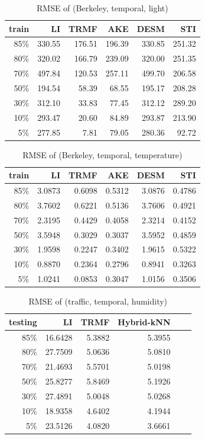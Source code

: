 \begin{table}[htbp]
\centering
\caption{RMSE of (Berkeley, temporal, light)}
\label{table:berkeley_temporal_light}
\begin{tabular}{ r | r r r r r}
	train	&LI	&TRMF	&AKE	&DESM	&STI\\ \hline
	85\%	&330.55	&176.51	&196.39	&330.85	&251.32\\ 
	80\%	&320.02	&166.79	&239.09	&320.00	&251.35\\
	70\%	&497.84	&120.53	&257.11	&499.70	&206.58\\
	50\%	&194.54	&58.39	&68.55	&195.17	&208.28\\
	30\%	&312.10	&33.83	&77.45	&312.12	&289.20\\
	10\%	&293.47	&20.60	&84.89	&293.87	&213.90\\
	 5\%	&277.85	&7.81	&79.05	&280.36	& 92.72
\end{tabular}
\end{table}


\begin{table}[htbp]
\centering
\caption{RMSE of (Berkeley, temporal, temperature)}
\label{table:berkeley_temporal_tem}
\begin{tabular}{ r | r r r r r}
	train	&LI	&TRMF	&AKE	&DESM	&STI\\ \hline
	85\%	&3.0873	&0.6098	&0.5312	&3.0876	&0.4786\\ 
	80\%	&3.7602	&0.6221	&0.5136	&3.7606	&0.4921\\
	70\%	&2.3195	&0.4429	&0.4058	&2.3214	&0.4152\\
	50\%	&3.5948	&0.3029	&0.3037	&3.5952	&0.4859\\
	30\%	&1.9598	&0.2247	&0.3402	&1.9615	&0.5322\\
	10\%	&0.8870	&0.2364	&0.2796	&0.8941	&0.3263\\
	 5\%	&1.0241	&0.0853	&0.3047	&1.0156	&0.3506
\end{tabular}
\end{table}

\begin{table} [htbp]
\centering
\caption{RMSE of (traffic, temporal, humidity)}
\label{table:traffic_temporal_hum}
\begin{tabular}{ r | r r r r r}
	testing	&LI	&TRMF	&Hybrid-kNN \\ \hline
	85\%	&16.6428	&5.3882	&5.3955\\ 
	80\%	&27.7509	&5.0636	&5.0810\\
	70\%	&21.4693	&5.5701	&5.0198\\
	50\%	&25.8277	&5.8469	&5.1926\\
	30\%	&27.4891	&5.0048	&5.0268\\
	10\%	&18.9358	&4.6402	&4.1944\\
	 5\%	&23.5126	&4.0820	&3.6661
\end{tabular}
\end{table}


